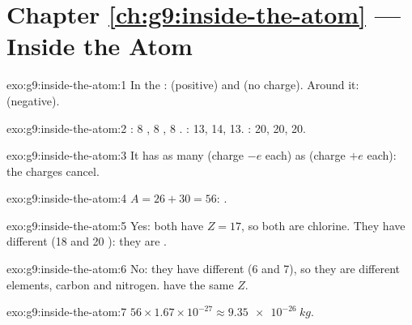 \section*{Chapter \ref{ch:g9:inside-the-atom} --- Inside the Atom}

\begin{solution}{exo:g9:inside-the-atom:1}
In the :  (positive) and  (no charge). Around it:
 (negative).
\end{solution}

\begin{solution}{exo:g9:inside-the-atom:2}
: 8 , 8 , 8 .
: 13, 14, 13. : 20, 20, 20.
\end{solution}

\begin{solution}{exo:g9:inside-the-atom:3}
It has as many  (charge $-e$ each) as  (charge $+e$
each): the charges cancel.
\end{solution}

\begin{solution}{exo:g9:inside-the-atom:4}
$A = 26 + 30 = 56$: .
\end{solution}

\begin{solution}{exo:g9:inside-the-atom:5}
Yes: both have $Z = 17$, so both are chlorine. They have different  (18 and 20 ): they are .
\end{solution}

\begin{solution}{exo:g9:inside-the-atom:6}
No: they have different  (6 and 7), so they are different
elements, carbon and nitrogen.  have the same $Z$.
\end{solution}

\begin{solution}{exo:g9:inside-the-atom:7}
$56 \times 1.67 \times 10^{-27} \approx \qty{9.35e-26}{kg}$.
\end{solution}

